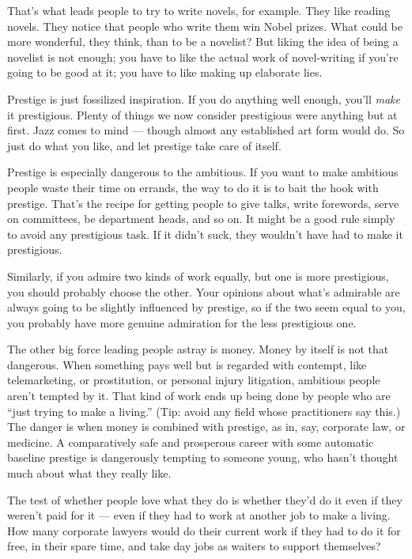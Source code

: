 \documentclass[12pt]{book}
\begin{document}
That's what leads people to try to write novels, for example. They like
reading novels. They notice that people who write them win Nobel prizes.
What could be more wonderful, they think, than to be a novelist? But
liking the idea of being a novelist is not enough; you have to like the
actual work of novel-writing if you're going to be good at it; you have
to like making up elaborate lies.

Prestige is just fossilized inspiration. If you do anything well enough,
you'll \emph{make} it prestigious. Plenty of things we now consider
prestigious were anything but at first. Jazz comes to mind --- though
almost any established art form would do. So just do what you like, and
let prestige take care of itself.

Prestige is especially dangerous to the ambitious. If you want to make
ambitious people waste their time on errands, the way to do it is to
bait the hook with prestige. That's the recipe for getting people to
give talks, write forewords, serve on committees, be department heads,
and so on. It might be a good rule simply to avoid any prestigious task.
If it didn't suck, they wouldn't have had to make it prestigious.

Similarly, if you admire two kinds of work equally, but one is more
prestigious, you should probably choose the other. Your opinions about
what's admirable are always going to be slightly influenced by prestige,
so if the two seem equal to you, you probably have more genuine
admiration for the less prestigious one.

The other big force leading people astray is money. Money by itself is
not that dangerous. When something pays well but is regarded with
contempt, like telemarketing, or prostitution, or personal injury
litigation, ambitious people aren't tempted by it. That kind of work
ends up being done by people who are ``just trying to make a living.''
(Tip: avoid any field whose practitioners say this.) The danger is when
money is combined with prestige, as in, say, corporate law, or medicine.
A comparatively safe and prosperous career with some automatic baseline
prestige is dangerously tempting to someone young, who hasn't thought
much about what they really like.

The test of whether people love what they do is whether they'd do it
even if they weren't paid for it --- even if they had to work at another
job to make a living. How many corporate lawyers would do their current
work if they had to do it for free, in their spare time, and take day
jobs as waiters to support themselves?
\end{document}
